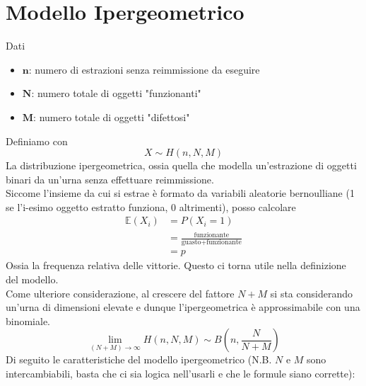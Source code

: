 \documentclass[11pt]{report}
\begin{document}
\section{Modello Ipergeometrico}
Dati
\begin{itemize}
    \item $\mathbf{n}$: numero di estrazioni senza reimmissione da eseguire
    \item $\mathbf{N}$: numero totale di oggetti "funzionanti"
    \item $\mathbf{M}$: numero totale di oggetti "difettosi"
\end{itemize}
Definiamo con
\begin{equation}
    X\sim H(n,N,M)
\end{equation}
La distribuzione ipergeometrica, ossia quella che modella un'estrazione di oggetti binari da un'urna senza effettuare reimmissione.\\
Siccome l'insieme da cui si estrae è formato da variabili aleatorie bernoulliane (1 se l'i-esimo oggetto estratto funziona, 0 altrimenti), posso calcolare
\begin{equation}
    \begin{split}
        \mathbb{E}(X_i) & = P(X_i = 1)\\
        & = \frac{\text{funzionante}}{\text{guasto} + \text{funzionante}}\\
        & = p
    \end{split}
\end{equation}
Ossia la frequenza relativa delle vittorie. Questo ci torna utile nella definizione del modello.\\
Come ulteriore considerazione, al crescere del fattore $N+M$ si sta considerando un'urna di dimensioni elevate e dunque l'ipergeometrica è approssimabile con una binomiale.
\begin{equation}
    \lim_{(N+M)\to\infty} H(n,N,M)\sim B \left( n, \frac{N}{N+M} \right)
\end{equation}
Di seguito le caratteristiche del modello ipergeometrico (N.B. $N$ e $M$ sono intercambiabili, basta che ci sia logica nell'usarli e che le formule siano corrette):
\end{document}
